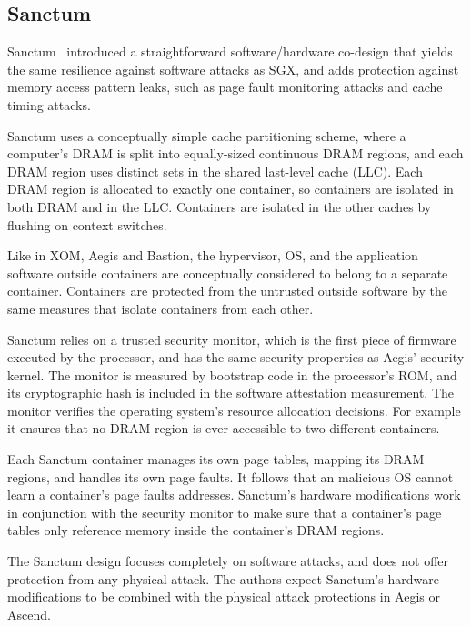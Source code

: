 \subsection{Sanctum}
\label{sec:related_sanctum}

Sanctum~\cite{costan2015sanctum} introduced a straightforward software/hardware
co-design that yields the same resilience against software attacks as SGX, and
adds protection against memory access pattern leaks, such as page fault
monitoring attacks and cache timing attacks.

Sanctum uses a conceptually simple cache partitioning scheme, where a
computer's DRAM is split into equally-sized continuous DRAM regions, and each
DRAM region uses distinct sets in the shared last-level cache (LLC). Each DRAM
region is allocated to exactly one container, so containers are isolated in
both DRAM and in the LLC. Containers are isolated in the other caches by
flushing on context switches.

Like in XOM, Aegis and Bastion, the hypervisor, OS, and the application
software outside containers are conceptually considered to belong to a separate
container. Containers are protected from the untrusted outside software by the
same measures that isolate containers from each other.

Sanctum relies on a trusted security monitor, which is the first piece of
firmware executed by the processor, and has the same security properties as
Aegis' security kernel. The monitor is measured by bootstrap code in the
processor's ROM, and its cryptographic hash is included in the software
attestation measurement. The monitor verifies the operating system's resource
allocation decisions. For example it ensures that no DRAM region is ever
accessible to two different containers.

Each Sanctum container manages its own page tables, mapping its DRAM regions,
and handles its own page faults. It follows that an malicious OS cannot learn
a container's page faults addresses. Sanctum's hardware modifications work in
conjunction with the security monitor to make sure that a container's page
tables only reference memory inside the container's DRAM regions.

The Sanctum design focuses completely on software attacks, and does not offer
protection from any physical attack. The authors expect Sanctum's hardware
modifications to be combined with the physical attack protections in Aegis or
Ascend.
